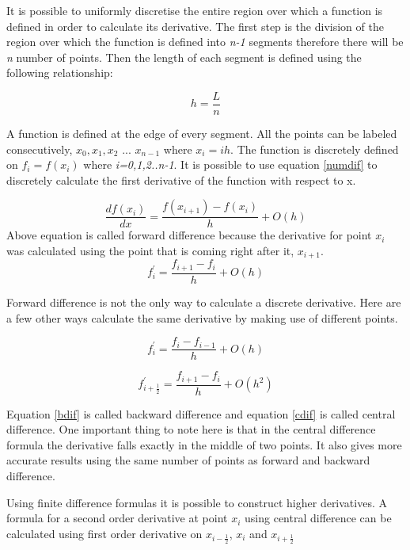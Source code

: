 It is possible to uniformly discretise the entire region over which a function is defined in order to calculate its derivative. The first step is the division of the region over which the function is defined into \textit{n-1} segments therefore there will be \textit{n} number of points. Then the length of each segment is defined using the following relationship:

\begin{equation}
h=\frac{L}{n}
\end{equation}

A function is defined at the edge of every segment. All the points can be labeled consecutively, $x_0,x_1,x_2$ ... $x_{n-1}$ where $x_i=ih$. The function is discretely defined on \textit{$f_{i}=f(x_{i})$} where\textit{ i=0,1,2..n-1}. It is possible to use equation  \ref{numdif} to discretely calculate the first derivative of the function with respect to x.

\begin{equation}
\frac{df(x_i)}{dx}=\frac{f(x_{i+1})-f(x_i)}{h} + O(h)
\end{equation}
Above equation is called forward difference because the derivative for point $x_i$ was calculated using the point that is coming right after it, $x_{i+1}$.
\begin{equation}
f^{'}_i=\frac{f_{i+1}-f_i}{h}+ O(h)
\end{equation}

Forward difference is not the only way to calculate a discrete derivative. Here are a few other ways calculate the same derivative by making use of different points.

\begin{equation}
f^{'}_i=\frac{f_{i}-f_{i-1}}{h}+ O(h)
\label{bdif}
\end{equation}

\begin{equation}
f^{'}_{i+\frac{1}{2}}=\frac{f_{i+1}-f_i}{h}+ O(h^2)
\label{cdif}
\end{equation}

Equation \ref{bdif} is called backward difference and equation \ref{cdif} is called central difference. One important thing to note here is that in the central difference formula the derivative falls exactly in the middle of two points. It also gives more accurate results using the same number of points as forward and backward difference. 

Using finite difference formulas it is possible to construct higher derivatives. A formula for a second order derivative at point $x_i$ using central difference can be calculated using first order derivative on $x_{i-\frac{1}{2}}$, $x_i$ and $x_{i+\frac{1}{2}}$  

